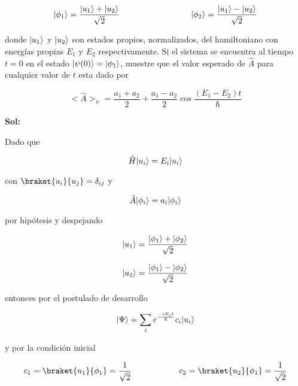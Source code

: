 \documentclass[12pt,a4paper]{article}
\DeclarePairedDelimiter\ket{\lvert}{\rangle}
\begin{document}
\begin{enumerate}
\begin{enumerate}
    \begin{equation*}
        \ket{\phi_1} = \frac{\ket{u_1} + \ket{u_2}}{\sqrt{2}} \hspace{3cm} \ket{\phi_2} = \frac{\ket{u_1} - \ket{u_2}}{\sqrt{2}}
    \end{equation*}
    
    donde $\ket{u_1}$ y $\ket{u_2}$ son estados propios, normalizados, del hamiltoniano con energías propias $E_1$ y $E_2$ respectivamente. Si el sistema se encuentra al tiempo $t =0$ en el estado $\ket{\psi (0)} = \ket{\phi_1}$, muestre que el valor esperado de $\hat{A}$ para cualquier valor de $t$ esta dado por
    
    \begin{equation*}
        <\hat{A}>_{\psi} = \frac{a_1 + a_2}{2} + \frac{a_1 - a_2}{2} \cos{\frac{(E_1 - E_2)t}{\hbar}}
    \end{equation*}
    
    \textbf{Sol:}
    
    Dado que
    
    \begin{equation*}
        \hat{H} \ket{u_i} = E_i \ket{u_i}
    \end{equation*}
    
    con $\braket{u_i}{u_j} = \delta_{ij}$ y
    
    \begin{equation*}
        \hat{A} \ket{\phi_i} = a_i \ket{\phi_i}
    \end{equation*}
    
    por hipótesis y despejando
    
    
    \begin{equation*}
        \ket{u_1} = \frac{\ket{\phi_1} + \ket{\phi_2}}{\sqrt{2}}
    \end{equation*}
    
    \begin{equation*}
        \ket{u_2} = \frac{\ket{\phi_1} - \ket{\phi_2}}{\sqrt{2}}
    \end{equation*}
    
    entonces por el postulado de desarrollo
    
    \begin{equation*}
        \ket{\Psi} = \sum_{i} e^{\frac{-iE_i t}{\hbar}} c_i \ket{u_i}
    \end{equation*}
    
    y por la condición inicial
    
    \begin{equation*}
        c_1 = \braket{u_1}{\phi_1}= \frac{1}{\sqrt{2}} \hspace{2cm} c_2 = \braket{u_2}{\phi_1} = \frac{1}{\sqrt{2}}
    \end{equation*}
    

\end{enumerate}
\end{enumerate}
\end{document}
